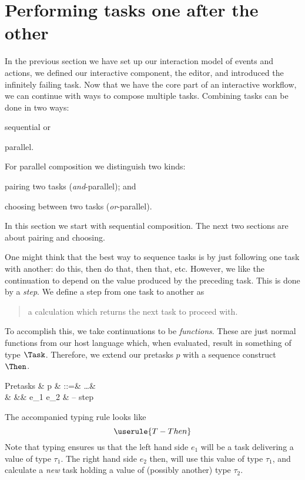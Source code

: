 
\section{Performing tasks one after the other}

In the previous section we have set up our interaction model of events and actions,
we defined our interactive component, the editor,
and introduced the infinitely failing task.
Now that we have the core part of an interactive workflow,
we can continue with ways to compose multiple tasks.
Combining tasks can be done in two ways:
\begin{enumerate*}
  \item sequential or
  \item parallel.
\end{enumerate*}
For parallel composition we distinguish two kinds:
\begin{enumerate*}[(a)]
  \item pairing two tasks (\emph{and}-parallel); and
  \item choosing between two tasks (\emph{or}-parallel).
\end{enumerate*}
In this section we start with sequential composition.
The next two sections are about pairing and choosing.

One might think that the best way to sequence tasks is by just following one task with another:
do this, then do that, then that, etc.
However, we like the continuation to depend on the value produced by the preceding task.
This is done by a \emph{step}.
We define a step from one task to another as
\begin{quote}
  a calculation which returns the next task to proceed with.
\end{quote}

To accomplish this,
we take continuations to be \emph{functions}.
These are just normal functions from our host language which,
when evaluated, result in something of type $\Task$.
Therefore,
we extend our pretasks $p$ with a sequence construct $\Then$.
\begin{grammar}
  Pretasks
    & p & ::=& \ldots        & \\
    &   &\mid& e_1 \Then e_2 & – step \\
\end{grammar}

The accompanied typing rule looks like
\begin{equation*}
  \userule{T-Then}
\end{equation*}
Note that typing ensures us that the left hand side $e_1$ will be a task delivering a value of type $\tau_1$.
The right hand side $e_2$ then, will use this value of type $\tau_1$,
and calculate a \emph{new} task holding a value of (possibly another) type $\tau_2$.

